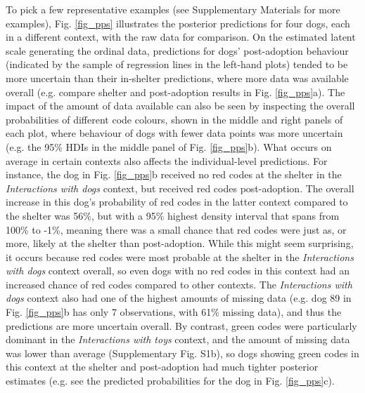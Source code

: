 \documentclass[fleqn,10pt]{wlscirep}
\begin{document}
To pick a few representative examples (see Supplementary Materials for more examples), Fig. \ref{fig_pps} illustrates the posterior predictions for four dogs, each in a different context, with the raw data for comparison. On the estimated latent scale generating the ordinal data, predictions for dogs' post-adoption behaviour (indicated by the sample of regression lines in the left-hand plots) tended to be more uncertain than their in-shelter predictions, where more data was available overall (e.g. compare shelter and post-adoption results in Fig. \ref{fig_pps}a). The impact of the amount of data available can also be seen by inspecting the overall probabilities of different code colours, shown in the middle and right panels of each plot, where behaviour of dogs with fewer data points was more uncertain (e.g. the 95\% HDIs in the middle panel of Fig. \ref{fig_pps}b). What occurs on average in certain contexts also affects the individual-level predictions. For instance, the dog in Fig. \ref{fig_pps}b received no red codes at the shelter in the \textit{Interactions with dogs} context, but received red codes post-adoption. The overall increase in this dog's probability of red codes in the latter context compared to the shelter was 56\%, but with a 95\% highest density interval that spans from 100\% to -1\%, meaning there was a small chance that red codes were just as, or more, likely at the shelter than post-adoption. While this might seem surprising, it occurs because red codes were most probable at the shelter in the \textit{Interactions with dogs} context overall, so even dogs with no red codes in this context had an increased chance of red codes compared to other contexts. The \textit{Interactions with dogs} context also had one of the highest amounts of missing data (e.g. dog 89 in Fig. \ref{fig_pps}b has only 7 observations, with 61\% missing data), and thus the predictions are more uncertain overall. By contrast, green codes were particularly dominant in the \textit{Interactions with toys} context, and the amount of missing data was lower than average (Supplementary Fig. S1b), so dogs showing green codes in this context at the shelter and post-adoption had much tighter posterior estimates (e.g. see the predicted probabilities for the dog in Fig. \ref{fig_pps}c).
\end{document}
